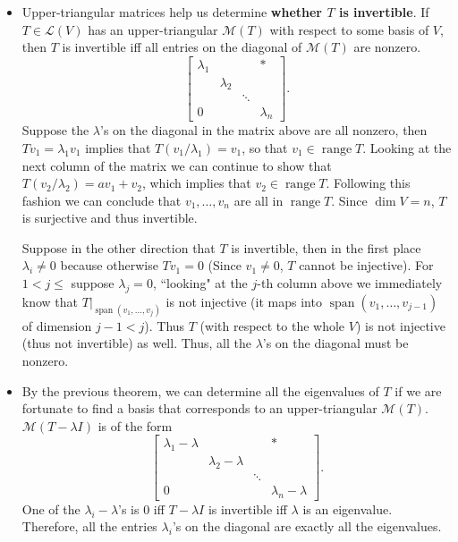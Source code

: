 \documentclass{article}
\newcommand{\s}{\operatorname{span}}
\renewcommand{\r}{\operatorname{range}}
\renewcommand{\d}{\dim}
\newcommand{\LV}{\mathcal{L}(V)}
\newcommand{\M}{\mathcal{M}}
\begin{document}
\begin{itemize}
    \item Upper-triangular matrices help us determine \textbf{whether $T$ is invertible}. If $T \in \LV$ has an upper-triangular $\M(T)$ with respect to some basis of $V$, then $T$ is invertible iff all entries on the diagonal of $\M(T)$ are nonzero.
    \begin{equation*}
        \begin{bmatrix}
        \lambda_1 & & & \ast \\
         & \lambda_2 & & \\
         & & \ddots & \\
         0 & & & \lambda_n
    \end{bmatrix}.
    \end{equation*}
    Suppose the $\lambda$'s on the diagonal in the matrix above are all nonzero, then $Tv_1 = \lambda_1 v_1$ implies that $T(v_1/\lambda_1) = v_1$, so that $v_1 \in \r T$. Looking at the next column of the matrix we can continue to show that $T(v_2/\lambda_2)=av_1+v_2$, which implies that $v_2 \in \r T$. Following this fashion we can conclude that $v_1,\dots,v_n$ are all in $\r T$. Since $\d V = n$, $T$ is surjective and thus invertible.
    
    Suppose in the other direction that $T$ is invertible, then in the first place $\lambda_i \not= 0$ because otherwise $Tv_1 = 0$ (Since $v_1 \not= 0$, $T$ cannot be injective). For $1 < j \leq $ suppose $\lambda_j = 0$, ``looking" at the $j$-th column above we immediately know that $T|_{\s(v_1,\dots,v_j)}$ is not injective (it maps into $\s(v_1,\dots,v_{j-1})$ of dimension $j-1<j$). Thus $T$ (with respect to the whole $V$) is not injective (thus not invertible) as well. Thus, all the $\lambda$'s on the diagonal must be nonzero.
    \item By the previous theorem, we can determine all the eigenvalues of $T$ if we are fortunate to find a basis that corresponds to an upper-triangular $\M(T)$. $\M(T - \lambda I)$ is of the form
    \begin{equation*}
        \begin{bmatrix}
        \lambda_1 - \lambda & & & \ast \\
         & \lambda_2 - \lambda & & \\
         & & \ddots & \\
         0 & & & \lambda_n - \lambda
    \end{bmatrix}.
    \end{equation*}
    One of the $\lambda_i - \lambda$'s is 0 iff $T - \lambda I$ is invertible iff $\lambda$ is an eigenvalue. Therefore, all the entries $\lambda_i$'s on the diagonal are exactly all the eigenvalues.
\end{itemize}
\end{document}
